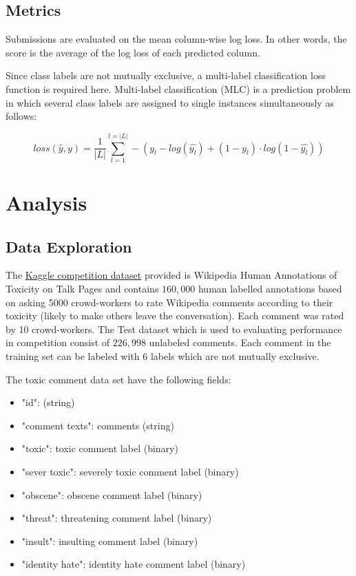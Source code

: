 \documentclass{article}
\begin{document}
    \subsection{Metrics}

    Submissions are evaluated on the mean column-wise log loss. In other words, the score is the average of the log loss of each predicted column.


    Since class labels are not mutually exclusive, a multi-label classification loss function is required here. Multi-label classification (MLC) is a prediction problem in which several class labels are assigned to single instances simultaneously as follows:

    \begin{equation}
            loss(\hat{y}, y) = \frac{1}{|L|} \sum_{l=1}^{l=|L|} - (y_l - log(\hat{y_l}) + (1-y_l) \cdot log(1-\hat{y_l}))
    \end{equation}



\section{Analysis}

    \subsection{Data Exploration}

    The \href{https://www.kaggle.com/c/jigsaw-toxic-comment-classification-challenge/data}{Kaggle competition dataset} provided is Wikipedia Human Annotations of Toxicity on Talk Pages and contains $160,000$ human labelled annotations based on asking 5000 crowd-workers to rate Wikipedia comments according to their toxicity (likely to make others leave the conversation). Each comment was rated by 10 crowd-workers. The Test dataset which is used to evaluating performance in competition consist of $226,998$ unlabeled comments. Each comment in the training set can be labeled with $6$ labels which are not mutually exclusive.

    The toxic comment data set have the following fields:

    \begin{itemize}
        \item "id": (string)
        \item "comment texts": comments (string)
        \item "toxic": toxic comment label (binary)
        \item "sever toxic": severely toxic comment label (binary)
        \item "obscene": obscene comment label (binary)
        \item "threat": threatening comment label (binary)
        \item "insult": insulting comment label (binary)
        \item "identity hate": identity hate comment label (binary)
    \end{itemize}
\end{document}

